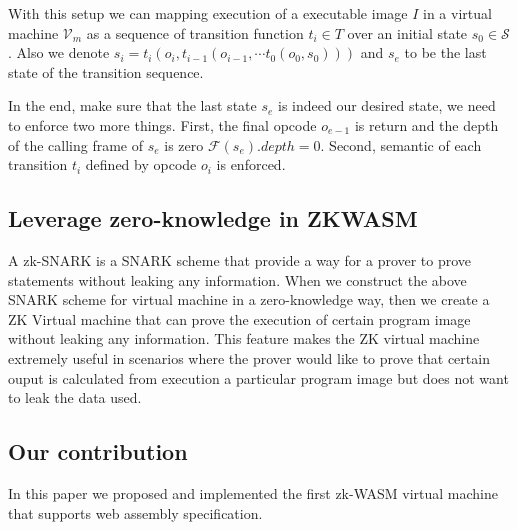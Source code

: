 With this setup we can mapping execution of a executable image $I$ in a virtual machine $\mathcal{V}_m$ as a sequence of transition function $t_i \in T$ over an initial state $s_0 \in \mathcal{S}$. Also we denote $s_i = t_i (o_i, t_{i-1}(o_{i-1}, \cdots t_0(o_0, s_0)))$ and $s_e$ to be the last state of the transition sequence.

In the end, make sure that the last state $s_e$ is indeed our desired state, we need to enforce two more things. First, the final opcode $o_{e-1}$ is return and the depth of the calling frame of $s_e$ is zero $\mathcal{F}(s_e).depth = 0$. Second, semantic of each transition $t_i$ defined by opcode $o_i$ is enforced.

\subsection{Leverage zero-knowledge in ZKWASM}
A zk-SNARK is a SNARK scheme that provide a way for a prover to prove statements without leaking any information. When we construct the above SNARK scheme for virtual machine in a zero-knowledge way, then we create a ZK Virtual machine that can prove the execution of certain program image without leaking any information.  This feature makes the ZK virtual machine extremely useful in scenarios where the prover would like to prove that certain ouput is calculated from execution a particular program image but does not want to leak the data used.
 
\subsection{Our contribution}
In this paper we proposed and implemented the first zk-WASM virtual machine that supports web assembly specification.
